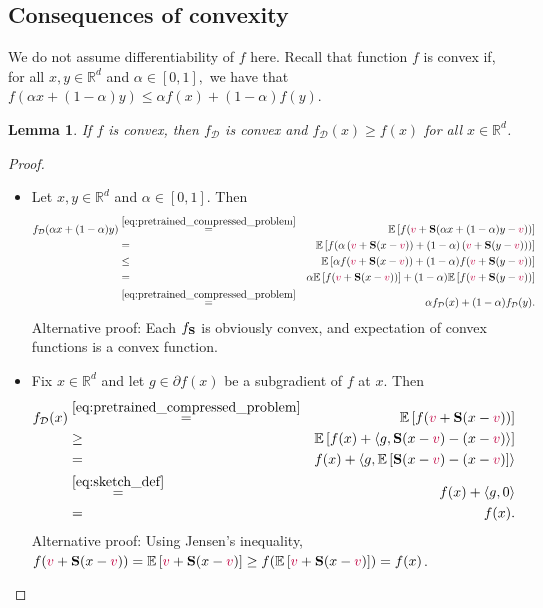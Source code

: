 \documentclass{article}
\newcommand{\ve}[2]{\left\langle #1 ,  #2 \right\rangle}
\newcommand{\shift}{{\color{purple}s}}
\newcommand{\bb}{\mathbb}
\newcommand{\R}{\bb R}
\newcommand{\Exp}[1]{{\bb E}\left[#1\right]}
\newtheorem{lemma}{Lemma}
\theoremstyle{plain}
\newcommand{\tf}{f_{\mathcal{D}}}
\renewcommand{\shift}{{\color{purple}v}}
\newcommand{\mS}{{\bf S}}
\theoremstyle{plain}
\theoremstyle{definition}
\theoremstyle{remark}
\begin{document}
\subsection{Consequences of convexity}

We do not assume differentiability of $f$ here. Recall that function $f$ is convex if, for all $x,y\in\mathbb{R}^d$ and $\alpha\in[0,1],$ we have that $f(\alpha x + (1-\alpha)y) \leq \alpha f(x) + (1-\alpha)f(y).$
\begin{lemma}\label{lem:convex-only_appendix} If $f$ is convex, then $\tf$ is convex and $\tf(x)\geq f(x)$ for all $x\in \R^d$.
\end{lemma}
\begin{proof}

	\begin{itemize}
		\item[(i)] Let $x, y\in \R^d$ and $\alpha \in [0,1]$. Then
		\begin{eqnarray*} \tf(\alpha x + (1-\alpha)y) &\overset{\eqref{eq:pretrained_compressed_problem}}{=}& \Exp{ f(\shift + \mS (\alpha x + (1-\alpha)y - \shift)) } \\
			&=&\Exp{ f( \alpha \left( \shift + \mS (x-\shift) \right) + (1-\alpha) \left( \shift + \mS (y - \shift)\right) ) } \\
			&\leq &\Exp{ \alpha f( \shift + \mS (x-\shift)) + (1-\alpha) f( \shift + \mS (y - \shift)) } \\
			&= & \alpha \Exp{ f(\shift +  \mS (x-\shift))} + (1-\alpha) \Exp{ f( \shift + \mS (y - \shift)) } \\
			&\overset{\eqref{eq:pretrained_compressed_problem}}{=} & \alpha \tf(x) + (1-\alpha) \tf(y).
		\end{eqnarray*}
  Alternative proof: Each $f_{\mS}$ is obviously convex, and expectation of convex functions is a convex function.
		\item[(ii)]
		Fix $x\in \R^d$ and let $g \in \partial f(x)$ be a subgradient of $f$ at $x$. Then
		\begin{eqnarray*} \tf(x) &\overset{\eqref{eq:pretrained_compressed_problem}}{=}& \Exp{ f( \shift +\mS (x-\shift)) }\\
			&\geq & \Exp{ f(x) + \ve{ g }{  \mS (x-\shift) - (x-\shift) } } \\
			& = & f(x) +  \ve{ g }{ \Exp{ \mS (x-\shift) - (x-\shift) } } \\
			& \overset{\eqref{eq:sketch_def}}{=} & f(x) +  \ve{ g }{ 0 }  \\
			& = & f(x).
		\end{eqnarray*}
    Alternative proof: Using Jensen's inequality, $f(\shift + \mS(x-\shift)) = \Exp{\shift + \mS(x-\shift)} \geq f(\Exp{\shift + \mS(x-\shift)}) = f(x)$.
	\end{itemize}
\end{proof}
\end{document}
